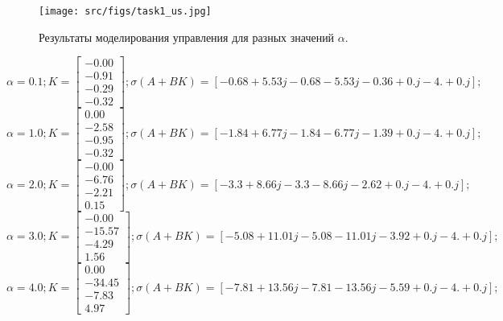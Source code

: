 \begin{figure}[ht!]
        \centering
        \texttt{[image: src/figs/task1\_us.jpg]}
        \caption{Результаты моделирования управления для разных значений \(\alpha\).}
        \label{fig:task1_us}
\end{figure}


\[
\alpha = 0.1; 
K = \begin{bmatrix}
 -0.00\\
 -0.91\\
 -0.29\\
 -0.32
\end{bmatrix};
\sigma(A+BK) = [-0.68+5.53j -0.68-5.53j -0.36+0.j   -4.  +0.j  ];
\]
\[
\alpha = 1.0; 
K = \begin{bmatrix}
  0.00\\
 -2.58\\
 -0.95\\
 -0.32
\end{bmatrix};
\sigma(A+BK) = [-1.84+6.77j -1.84-6.77j -1.39+0.j   -4.  +0.j  ];
\]
\[
\alpha = 2.0; 
K = \begin{bmatrix}
 -0.00\\
 -6.76\\
 -2.21\\
  0.15
\end{bmatrix};
\sigma(A+BK) = [-3.3 +8.66j -3.3 -8.66j -2.62+0.j   -4.  +0.j  ];
\]
\[
\alpha = 3.0; 
K = \begin{bmatrix}
 -0.00\\
 -15.57\\
 -4.29\\
  1.56
\end{bmatrix};
\sigma(A+BK) = [-5.08+11.01j -5.08-11.01j -3.92 +0.j   -4.   +0.j  ];
\]
\[
\alpha = 4.0; 
K = \begin{bmatrix}
  0.00\\
 -34.45\\
 -7.83\\
  4.97
\end{bmatrix};
\sigma(A+BK) = [-7.81+13.56j -7.81-13.56j -5.59 +0.j   -4.   +0.j  ];
\]



\FloatBarrier